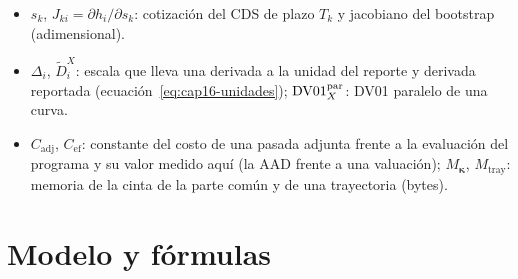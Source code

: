 \begin{itemize}
        (variables que dependen de $\boldsymbol\vartheta$ y no de $\omega_p$).
  \item $s_k$, $J_{ki}=\partial h_i/\partial s_k$: cotización del CDS de plazo $T_k$ y jacobiano del bootstrap
        (adimensional).
  \item $\Delta_i$, $\widetilde D^{X}_i$: escala que lleva una derivada a la unidad del reporte y derivada reportada
        (ecuación~\eqref{eq:cap16-unidades}); $\mathrm{DV01}^{\mathrm{par}}_X$: DV01 paralelo de una curva.
  \item $C_{\mathrm{adj}}$, $C_{\mathrm{ef}}$: constante del costo de una pasada adjunta frente a la evaluación del
        programa y su valor medido aquí (la AAD frente a una valuación); $M_{\boldsymbol\kappa}$, $M_{\mathrm{tray}}$:
        memoria de la cinta de la parte común y de una trayectoria (bytes).
\end{itemize}

\section{Modelo y fórmulas}\label{sec:cap16-modelo}

